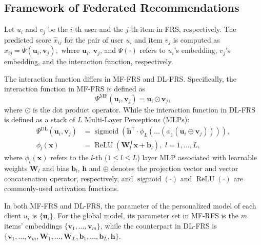 \subsection{Framework of Federated Recommendations} 
\label{ssec:FR-fram}

Let $u_i$ and $v_j$ be the $i$-th user and the $j$-th item in FRS, respectively.
The predicted score $\hat{x}_{ij}$ for the pair of user $u_i$ and item $v_j$ is computed as
$
\hat{x}_{ij} = \Psi(\mathbf{u}_i, \mathbf{v}_j),
$
where $\mathbf{u}_i$, $\mathbf{v}_j$, and $\Psi(\cdot)$ refers to $u_i$'s embedding, $v_j$'s embedding, and the interaction function, respectively.

The interaction function differs in MF-FRS and DL-FRS. 
Specifically, the interaction function in MF-FRS is defined as
\begin{equation*}
\Psi^\text{MF}(\mathbf{u}_i, \mathbf{v}_j) = \mathbf{u}_i \odot \mathbf{v}_j,
\end{equation*}
where $\odot$ is the dot product operator. While the interaction function in DL-FRS is defined as a stack of $L$ Multi-Layer Perceptions (MLPs):
\begin{equation}\label{equation:DL_interaction_function}
\begin{aligned}
\Psi^\text{DL}(\mathbf{u}_i, \mathbf{v}_j) & = \operatorname{sigmoid}(\mathbf{h}^\mathsf{T} \cdot \phi_L(\ldots(\phi_1(\mathbf{u}_i \oplus \mathbf{v}_j)))), \\
\phi_l(\mathbf{x}) & = \operatorname{ReLU}(\mathbf{W}_l^\mathsf{T}\mathbf{x} + \mathbf{b}_l), \,\, l = 1, \ldots, L,
\end{aligned}
\end{equation}
where $\phi_l(\mathbf{x})$ refers to the $l$-th ($1 \leq l \leq L$) layer MLP associated with learnable weights $\mathbf{W}_l$ and bias $\mathbf{b}_l$, $\mathbf{h}$ and $\oplus$ denotes the projection vector and vector concatenation operator, respectively, and $\operatorname{sigmoid}(\cdot)$ and $\operatorname{ReLU}(\cdot)$ are commonly-used activation functions.


In both MF-FRS and DL-FRS, the parameter of the personalized model of each client $u_i$ is $\{\mathbf{u}_i\}$.
For the global model, its parameter set in MF-RFS is the $m$ items' embeddings $\{\mathbf{v}_1, \ldots, \mathbf{v}_m\}$, while the counterpart in DL-FRS is 
$\{\mathbf{v}_1, \ldots, \mathbf{v}_m, \mathbf{W}_1, \ldots, \mathbf{W}_L, \mathbf{b}_1, \ldots, \mathbf{b}_L, \mathbf{h}\}$.

